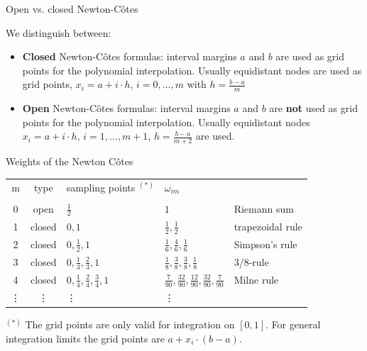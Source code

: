 \begin{vbframe}{Open vs. closed Newton-C\^{o}tes}

We distinguish between:

\begin{itemize}
\item \textbf{Closed} Newton-C\^{o}tes formulas: interval margins $a$ and $b$ are used as grid points for the polynomial interpolation. Usually equidistant nodes are used as grid points, $x_i = a + i \cdot h$, $i = 0, ..., m$ with $h = \frac{b - a}{m}$
\item \textbf{Open} Newton-C\^{o}tes formulas: interval margins $a$ and $b$ are \textbf{not} used as grid points for the polynomial interpolation. Usually equidistant nodes $x_i = a + i\cdot h$, $i = 1, ..., m + 1$, $h = \frac{b - a}{m + 2}$ are used.
\end{itemize}

\end{vbframe}

\begin{vbframe}{Weights of the Newton C\^{o}tes}

\begin{center}
\begin{table}
\small
\begin{tabular}{c c| l l l}
m & type & sampling points $^{(*)}$ & $\omega_{im}$ & \\
\\
0 & open & $\frac{1}{2}$ & $1$ & Riemann sum \\
1 & closed & $0, 1$ & $\frac{1}{2}, \frac{1}{2}$ & trapezoidal rule \\
2 & closed & $0, \frac{1}{2}, 1$ & $\frac{1}{6}, \frac{4}{6}, \frac{1}{6}$ & Simpson's rule \\
3 & closed & $0, \frac{1}{3}, \frac{2}{3}, 1$ & $\frac{1}{8}, \frac{3}{8}, \frac{3}{8}, \frac{1}{8}$ & 3/8-rule \\
4 & closed & $0, \frac{1}{4}, \frac{2}{4}, \frac{3}{4}, 1$ & $\frac{7}{90}, \frac{32}{90}, \frac{12}{90}, \frac{32}{90}, \frac{7}{90}$ & Milne rule \\
\vdots & \vdots & \vdots & \vdots &\\
\end{tabular}
\end{table}
\end{center}

\begin{footnotesize}
$^{(*)}$ The grid points are only valid for integration on $[0, 1]$. For general integration limits the grid points are $a + x_i \cdot (b - a)$.
\end{footnotesize}

\end{vbframe}


